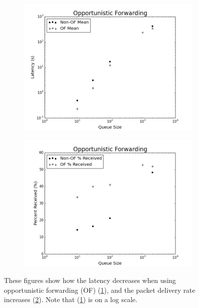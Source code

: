         \begin{figure}
            \centering
            \begin{subfigure}{0.5\textwidth}
                \centering
                \includegraphics[width=\linewidth]{./images/OF_Latency.png}
                \caption{}
                \label{fig:of_latency}
            \end{subfigure}%
            \begin{subfigure}{0.5\textwidth}
                \includegraphics[width=\linewidth]{./images/OF_Received.png}
                \caption{}
                \label{fig:of_recieved}
            \end{subfigure}
            \caption{These figures show how the latency decreases when using opportunistic forwarding (OF) (\ref{fig:of_latency}), and the packet delivery rate increases (\ref{fig:of_recieved}). Note that (\ref{fig:of_latency}) is on a log scale.}
            \label{fig:opportunistic_forwarding}
        \end{figure}

